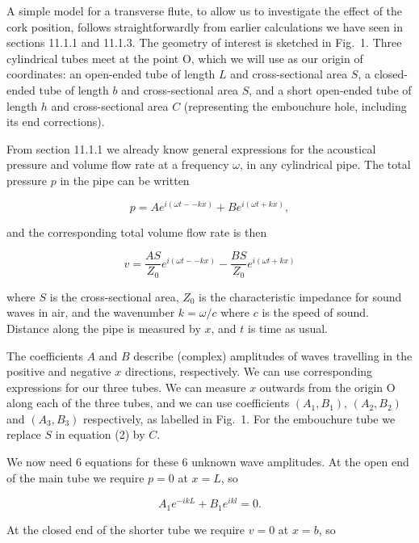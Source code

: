   A simple model for a transverse flute, to allow us to investigate the effect 
  of the cork position, follows straightforwardly from earlier calculations we 
  have seen in sections 11.1.1 and 11.1.3. The geometry of interest is sketched 
  in Fig.\ 1. Three cylindrical tubes meet at the point O, which we will use as 
  our origin of coordinates: an open-ended tube of length $L$ and 
  cross-sectional area $S$, a closed-ended tube of length $b$ and 
  cross-sectional area $S$, and a short open-ended tube of length $h$ and 
  cross-sectional area $C$ (representing the embouchure hole, including its end 
  corrections). 


  From section 11.1.1 we already know general expressions for the acoustical 
  pressure and volume flow rate at a frequency $\omega$, in any cylindrical 
  pipe. The total pressure $p$ in the pipe can be written 

  $$p=Ae^{i(\omega t -- kx)}+Be^{i(\omega t + kx)} , \tag{1}$$ 

  and the corresponding total volume flow rate is then 

  $$v=\dfrac{AS}{Z_0}e^{i(\omega t -- kx)}-\dfrac{BS}{Z_0}e^{i(\omega t + kx)} 
  \tag{2}$$ 

  where $S$ is the cross-sectional area, $Z_0$ is the characteristic impedance 
  for sound waves in air, and the wavenumber $k=\omega/c$ where $c$ is the 
  speed of sound. Distance along the pipe is measured by $x$, and $t$ is time 
  as usual. 

  The coefficients $A$ and $B$ describe (complex) amplitudes of waves 
  travelling in the positive and negative $x$ directions, respectively. We can 
  use corresponding expressions for our three tubes. We can measure $x$ 
  outwards from the origin O along each of the three tubes, and we can use 
  coefficients $(A_1,B_1)$, $(A_2,B_2)$ and $(A_3,B_3)$ respectively, as 
  labelled in Fig.\ 1. For the embouchure tube we replace $S$ in equation (2) 
  by $C$. 

  We now need 6 equations for these 6 unknown wave amplitudes. At the open end 
  of the main tube we require $p=0$ at $x=L$, so 

  $$A_1 e^{-ikL} + B_1 e^{ikl} =0. \tag{3}$$ 

  At the closed end of the shorter tube we require $v=0$ at $x=b$, so 

